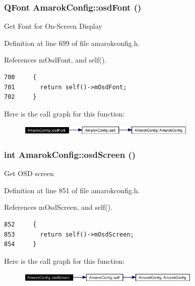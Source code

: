 \subsubsection{\setlength{\rightskip}{0pt plus 5cm}QFont Amarok\-Config::osd\-Font ()\hspace{0.3cm}{\tt  [inline, static]}}\label{classAmarokConfig_AmarokConfige72}


Get Font for On-Screen Display 

Definition at line 699 of file amarokconfig.h.

References m\-Osd\-Font, and self().



\footnotesize\begin{verbatim}700     {
701       return self()->mOsdFont;
702     }
\end{verbatim}\normalsize 


Here is the call graph for this function:\begin{figure}[H]
\begin{center}
\leavevmode
\includegraphics[width=242pt]{classAmarokConfig_AmarokConfige72_cgraph}
\end{center}
\end{figure}
\subsubsection{\setlength{\rightskip}{0pt plus 5cm}int Amarok\-Config::osd\-Screen ()\hspace{0.3cm}{\tt  [inline, static]}}\label{classAmarokConfig_AmarokConfige88}


Get OSD screen 

Definition at line 851 of file amarokconfig.h.

References m\-Osd\-Screen, and self().



\footnotesize\begin{verbatim}852     {
853       return self()->mOsdScreen;
854     }
\end{verbatim}\normalsize 


Here is the call graph for this function:\begin{figure}[H]
\begin{center}
\leavevmode
\includegraphics[width=248pt]{classAmarokConfig_AmarokConfige88_cgraph}
\end{center}
\end{figure}
